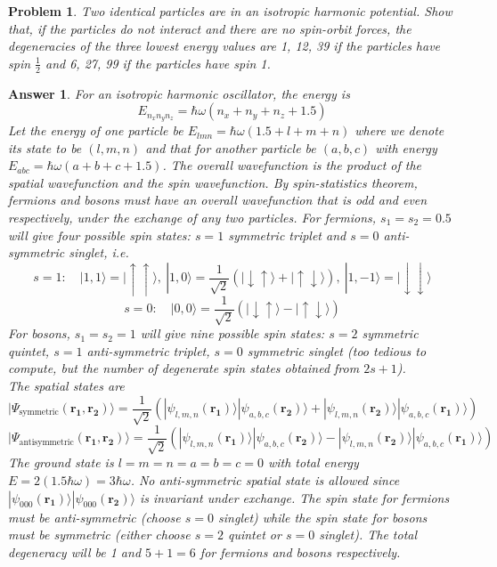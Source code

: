 \documentclass[a4paper]{article}
\newtheorem{ans}{Answer}[section]
\theoremstyle{new}
\newtheorem{qns}{Problem}[section]
\begin{document}
\newpage
\begin{qns}
Two identical particles are in an isotropic harmonic potential. Show that, if the particles do not interact and there are no spin-orbit forces, the degeneracies of the three lowest energy values are 1, 12, 39 if the particles have spin $\frac{1}{2}$ and 6, 27, 99 if the particles have spin 1.
\end{qns}
\begin{ans}
For an isotropic harmonic oscillator, the energy is
$$E_{n_xn_yn_z}=\hbar\omega(n_x+n_y+n_z+1.5)$$
Let the energy of one particle be $E_{lmn}=\hbar\omega(1.5+l+m+n)$ where we denote its state to be $(l,m,n)$ and that for another particle be $(a,b,c)$ with energy $E_{abc}=\hbar\omega(a+b+c+1.5)$. The overall wavefunction is the product of the spatial wavefunction and the spin wavefunction. By spin-statistics theorem, fermions and bosons must have an overall wavefunction that is odd and even respectively, under the exchange of any two particles. For fermions, $s_1=s_2=0.5$ will give four possible spin states: $s=1$ symmetric triplet and $s=0$ anti-symmetric singlet, i.e.
$$s=1:\quad |1,1\rangle=|\uparrow\uparrow\rangle,~|1,0\rangle=\frac{1}{\sqrt{2}}(|\downarrow\uparrow\rangle+|\uparrow\downarrow\rangle),~|1,-1\rangle=|\downarrow\downarrow\rangle$$
$$s=0:\quad|0,0\rangle=\frac{1}{\sqrt{2}}(|\downarrow\uparrow\rangle-|\uparrow\downarrow\rangle)$$
For bosons, $s_1=s_2=1$ will give nine possible spin states: $s=2$ symmetric quintet, $s=1$ anti-symmetric triplet, $s=0$ symmetric singlet (too tedious to compute, but the number of degenerate spin states obtained from $2s+1$).\\[5pt]
The spatial states are
$$|\Psi_{\text{symmetric}}(\mathbf{r_1},\mathbf{r_2})\rangle=\frac{1}{\sqrt{2}}(|\psi_{l,m,n}(\mathbf{r_1})\rangle|\psi_{a,b,c}(\mathbf{r_2})\rangle+|\psi_{l,m,n}(\mathbf{r_2})\rangle|\psi_{a,b,c}(\mathbf{r_1})\rangle)$$
$$|\Psi_{\text{antisymmetric}}(\mathbf{r_1},\mathbf{r_2})\rangle=\frac{1}{\sqrt{2}}(|\psi_{l,m,n}(\mathbf{r_1})\rangle|\psi_{a,b,c}(\mathbf{r_2})\rangle-|\psi_{l,m,n}(\mathbf{r_2})\rangle|\psi_{a,b,c}(\mathbf{r_1})\rangle)$$
The ground state is $l=m=n=a=b=c=0$ with total energy $E=2(1.5\hbar\omega)=3\hbar\omega$. No anti-symmetric spatial state is allowed since $|\psi_{000}(\mathbf{r_1})\rangle|\psi_{000}(\mathbf{r_2})\rangle$ is invariant under exchange. The spin state for fermions must be anti-symmetric (choose $s=0$ singlet) while the spin state for bosons must be symmetric (either choose $s=2$ quintet or $s=0$ singlet). The total degeneracy will be 1 and $5+1=6$ for fermions and bosons respectively.\\[5pt]

\end{ans}
\end{document}
